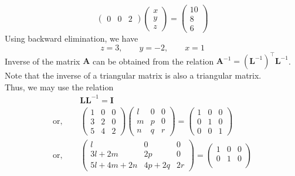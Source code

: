 \documentclass[12pt,class=book,crop=false]{standalone}
\begin{document}
\begin{soln}
\[\begin{pmatrix}
            0 & 0 & 2
        \end{pmatrix}\begin{pmatrix}
            x \\
            y \\
            z
        \end{pmatrix}
        =\begin{pmatrix}
            10 \\
            8  \\
            6
        \end{pmatrix}
    \]
    Using backward elimination, we have
    \[
        z=3,\qquad y=-2,\qquad x=1
    \]
    Inverse of the matrix $ \mathbf{A} $ can be obtained from the relation  $\mathbf{A}^{-1}=\left(\mathbf{L}^{-1}\right)^\top \mathbf{L}^{-1}$.\\
    Note that the inverse of a triangular matrix is also a triangular matrix.\\ Thus, we may use the relation
    \begin{align*}
                         & \mathbf{L}\mathbf{L}^{-1}=\mathbf{I} \\
        \text{or, }\quad & \begin{pmatrix}
            1 & 0 & 0 \\
            3 & 2 & 0 \\
            5 & 4 & 2
        \end{pmatrix}
        \begin{pmatrix}
            l & 0 & 0 \\
            m & p & 0 \\
            n & q & r
        \end{pmatrix}
        =\begin{pmatrix}
            1 & 0 & 0 \\
            0 & 1 & 0 \\
            0 & 0 & 1
        \end{pmatrix}                            \\
        \text{or,}\quad  & \begin{pmatrix}
            l        & 0     & 0  \\
            3l+2m    & 2p    & 0  \\
            5l+4m+2n & 4p+2q & 2r
        \end{pmatrix}
        =\begin{pmatrix}
            1 & 0 & 0 \\
            0 & 1 & 0 \\

\end{pmatrix}
\end{align*}
\end{soln}
\end{document}
